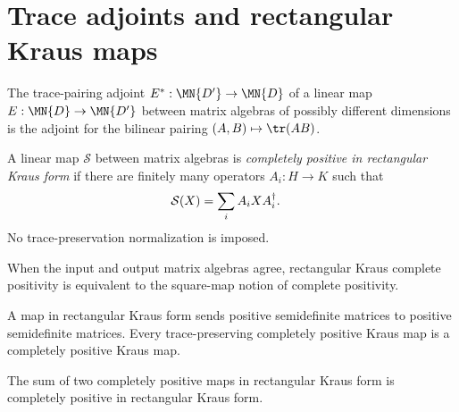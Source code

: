 \section{Trace adjoints and rectangular Kraus maps}

\begin{definition}\label{def:trace_pairing_adjoint}
    \leanok
    The trace-pairing adjoint $E^* : \MN{D'} \to \MN{D}$ of a linear map
    $E : \MN{D} \to \MN{D'}$ between matrix algebras of possibly different
    dimensions is the adjoint for the bilinear pairing
    $(A,B)\mapsto \tr(AB)$.
\end{definition}

\begin{definition}
    \label{def:is_kraus_cp}
    \leanok
    A linear map $\mathcal S$ between matrix algebras is \emph{completely
    positive in rectangular Kraus form} if there are finitely many operators
    $A_i:H\to K$ such that
    \begin{align}
        \mathcal S(X)&=\sum_i A_iXA_i^\dagger.
        \notag
    \end{align}
    No trace-preservation normalization is imposed.
\end{definition}

\begin{lemma}
    \label{lem:is_kraus_cp_iff_is_cp_map}
    \leanok
    When the input and output matrix algebras agree, rectangular Kraus complete
    positivity is equivalent to the square-map notion of complete positivity.
\end{lemma}

\begin{lemma}
    \label{lem:is_kraus_cp_basic}
    \leanok
    A map in rectangular Kraus form sends positive semidefinite matrices to
    positive semidefinite matrices. Every trace-preserving completely positive
    Kraus map is a completely positive Kraus map.
\end{lemma}

\begin{lemma}
    \label{lem:is_kraus_cp_add}
    \leanok
    The sum of two completely positive maps in rectangular Kraus form is
    completely positive in rectangular Kraus form.
\end{lemma}

